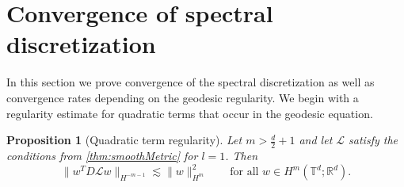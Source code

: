 \documentclass[a4paper, 12pt]{article}
\newtheorem{proposition}[theorem]{Proposition}
\newcommand{\R}{\mathbb{R}}
\newcommand{\T}{\mathbb{T}}
\renewcommand{\L}{\mathcal{L}}
\begin{document}
\section{Convergence of spectral discretization}\label{sec:convergence}
In this section we prove convergence of the spectral discretization as well as convergence rates depending on the geodesic regularity.
We begin with a regularity estimate for quadratic terms that occur in the geodesic equation.

\begin{proposition}[Quadratic term regularity]\label{thm:productsInB}
Let $m>\frac d2+1$ and let $\L$ satisfy the conditions from \cref{thm:smoothMetric} for $l=1$.
Then %
\begin{equation*}
\|w^TD\L w\|_{H^{-m-1}}\lesssim\|w\|_{H^m}^2
\qquad\text{for all }w\in H^m(\T^d;\R^d).
\end{equation*}
\end{proposition}
\end{document}
